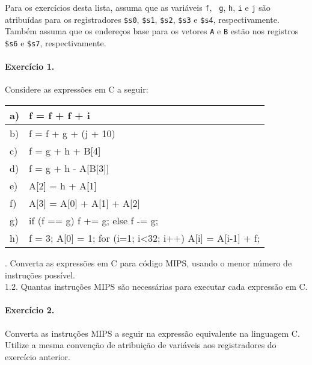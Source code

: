 
Para os exercícios desta lista, assuma que as variáveis {\tt f}, {\tt
  g}, {\tt h}, {\tt i} e {\tt j} são atribuídas para os registradores
{\tt \$s0}, {\tt \$s1}, {\tt \$s2}, {\tt \$s3} e {\tt \$s4},
respectivamente. Também assuma que os endereços base para os vetores
{\tt A} e {\tt B} estão nos registros {\tt \$s6} e {\tt \$s7},
respectivamente. 

\paragraph{Exercício 1.} Considere as expressões em C a seguir:

\begin{tt}
\begin{center}
\begin{tabular}{|l|l|}\hline
  a) &f = f + f + i\\\hline
  b) &f = f + g + (j + 10)\\\hline
  c) & f = g + h + B[4]\\\hline
  d) & f = g + h - A[B[3]]\\\hline
  e) & A[2] = h + A[1]\\\hline
  f) & A[3] = A[0] + A[1] + A[2]\\\hline
  g) & if (f == g) f += g; else f -= g;\\\hline
  h) & f = 3; A[0] = 1; for (i=1; i<32; i++) A[i] = A[i-1] + f;\\\hline
\end{tabular}
\end{center}
\end{tt}

. Converta as expressões em C para código MIPS, usando o menor
  número de instruções possível.\\
1.2. Quantas instruções MIPS são necessárias para executar cada
  expressão em C.\\

\paragraph{Exercício 2.} Converta as instruções MIPS a seguir na expressão
equivalente na linguagem C. Utilize a mesma convenção de atribuição de 
variáveis aos registradores do exercício anterior.\\


